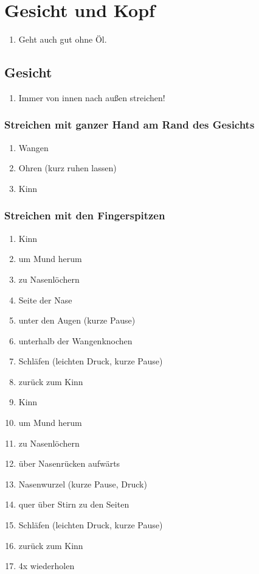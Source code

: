 \section{Gesicht und Kopf}
\begin{enumerate}
\item Geht auch gut ohne Öl.
\end{enumerate}

\subsection{Gesicht}
\begin{enumerate}
\item Immer von innen nach außen streichen!
\end{enumerate}


\subsubsection{Streichen mit ganzer Hand am Rand des Gesichts}
\begin{enumerate}
\item Wangen
\item Ohren (kurz ruhen lassen)
\item Kinn
\end{enumerate}

\subsubsection{Streichen mit den Fingerspitzen}
\begin{enumerate}
\item Kinn
\item um Mund herum
\item zu Nasenlöchern
\item Seite der Nase
\item unter den Augen (kurze Pause)
\item unterhalb der Wangenknochen
\item Schläfen (leichten Druck, kurze Pause)
\item zurück zum Kinn
\item Kinn 
\item um Mund herum 
\item zu Nasenlöchern
\item über Nasenrücken aufwärts
\item Nasenwurzel (kurze Pause, Druck)
\item quer über Stirn zu den Seiten
\item Schläfen (leichten Druck, kurze Pause)
\item zurück zum Kinn
\item 4x wiederholen
\end{enumerate}

